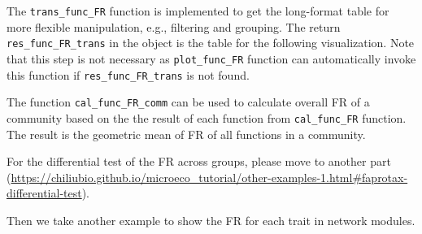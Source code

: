\documentclass[
]{book}
\newenvironment{Shaded}{\begin{snugshade}}{\end{snugshade}}
\newcommand{\FunctionTok}[1]{\textcolor[rgb]{0.13,0.29,0.53}{\textbf{#1}}}
\newcommand{\NormalTok}[1]{#1}
\newcommand{\SpecialCharTok}[1]{\textcolor[rgb]{0.81,0.36,0.00}{\textbf{#1}}}
\begin{document}
The \texttt{trans\_func\_FR} function is implemented to get the long-format table for more flexible manipulation, e.g., filtering and grouping.
The return \texttt{res\_func\_FR\_trans} in the object is the table for the following visualization.
Note that this step is not necessary as \texttt{plot\_func\_FR} function can automatically invoke this function if \texttt{res\_func\_FR\_trans} is not found.

\begin{Shaded}
\end{Shaded}

The function \texttt{cal\_func\_FR\_comm} can be used to calculate overall FR of a community based on the the result of each function from \texttt{cal\_func\_FR} function.
The result is the geometric mean of FR of all functions in a community.

\begin{Shaded}
\end{Shaded}

For the differential test of the FR across groups,
please move to another part (\url{https://chiliubio.github.io/microeco_tutorial/other-examples-1.html\#faprotax-differential-test}).

Then we take another example to show the FR for each trait in network modules.
\end{document}
